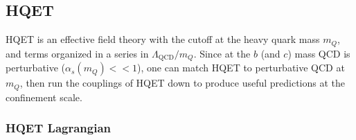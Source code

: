
\subsection{HQET}

HQET is an effective field theory with the cutoff at the heavy quark mass $m_Q$, and terms organized in a series in $\Lambda_{\text{QCD}}/m_Q$. Since at the $b$ (and $c$) mass QCD is perturbative ($\alpha_s(m_Q) << 1$), one can match HQET to perturbative QCD at $m_Q$, then run the couplings of HQET down to produce useful predictions at the confinement scale.


\subsubsection{HQET Lagrangian}

